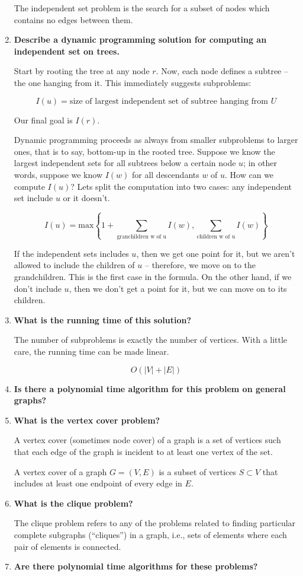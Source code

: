 \documentclass[a4paper,11pt]{article}
\begin{document}
\begin{enumerate}
  The independent set problem is the search for a subset of nodes which
  contains no edges between them.
\item
  \textbf{Describe a dynamic programming solution for computing an
  independent set on trees.}

  Start by rooting the tree at any node $r$. Now, each node defines a
  subtree -- the one hanging from it. This immediately suggests
  subproblems:

  \[I(u) = \text{size of largest independent set of subtree hanging from } U\]

  Our final goal is $I(r)$.

  Dynamic programming proceeds as always from smaller subproblems to
  larger ones, that is to say, bottom-up in the rooted tree. Suppose we
  know the largest independent sets for all subtrees below a certain
  node $u$; in other words, suppose we know $I(w)$ for all descendants
  $w$ of $u$. How can we compute $I(u)$? Lets split the computation into
  two cases: any independent set include $u$ or it doesn't.

  \[I(u) = \text{max} \left \lbrace 1 + \sum_{\text{granchildren w of u}} I(w), \sum_{\text{children w of u}} I(w)  \right \rbrace\]

  If the independent sets includes $u$, then we get one point for it,
  but we aren't allowed to include the children of $u$ -- therefore, we
  move on to the grandchildren. This is the first case in the formula.
  On the other hand, if we don't include $u$, then we don't get a point
  for it, but we can move on to its children.
\item
  \textbf{What is the running time of this solution?}

  The number of subproblems is exactly the number of vertices. With a
  little care, the running time can be made linear.

  \[O(|V| + |E|)\]
\item
  \textbf{Is there a polynomial time algorithm for this problem on
  general graphs?}
\item
  \textbf{What is the vertex cover problem?}

  A vertex cover (sometimes node cover) of a graph is a set of vertices
  such that each edge of the graph is incident to at least one vertex of
  the set.

  A vertex cover of a graph $G = (V,E)$ is a subset of vertices
  $S \subset V$ that includes at least one endpoint of every edge in
  $E$.
\item
  \textbf{What is the clique problem?}

  The clique problem refers to any of the problems related to finding
  particular complete subgraphs (``cliques'') in a graph, i.e., sets of
  elements where each pair of elements is connected.
\item
  \textbf{Are there polynomial time algorithms for these problems?}
\end{enumerate}
\end{document}
